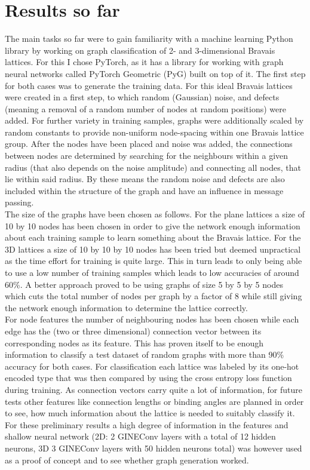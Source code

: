 \documentclass[11pt,a4paper]{article}
\begin{document}
\section{Results so far}
\label{sec:Results so far}
The main tasks so far were to gain familiarity with a machine learning Python library by working on graph classification of 2- and 3-dimensional Bravais lattices. 
For this I chose PyTorch, as it has a library for working with graph neural networks called PyTorch Geometric (PyG) built on top of it. 
The first step for both cases was to generate the training data. 
For this ideal Bravais lattices were created in a first step, to which random (Gaussian) noise, and defects (meaning a removal of a random number of nodes at random positions) were added. 
For further variety in training samples, graphs were additionally scaled by random constants to provide non-uniform node-spacing within one Bravais lattice group. 
After the nodes have been placed and noise was added, the connections between nodes are determined by searching for the neighbours within a given radius (that also depends on the noise amplitude) and connecting all nodes, that lie within said radius. 
By these means the random noise and defects are also included within the structure of the graph and have an influence in message passing. \\
The size of the graphs have been chosen as follows. 
For the plane lattices a size of 10 by 10 nodes has been chosen in order to give the network enough information about each training sample to learn something about the Bravais lattice. 
For the 3D lattices a  size of 10 by 10 by 10 nodes has been tried but deemed unpractical as the time effort for training is quite large. 
This in turn leads to only being able to use a low number of training samples which leads to low accuracies of around 60\%. 
A better approach proved to be using graphs of size 5 by 5 by 5 nodes which cuts the total number of nodes per graph by a factor of 8 while still giving the network enough information to determine the lattice correctly. \\
For node features the number of neighbouring nodes has been chosen while each edge has the (two or three dimensional) connection vector between its corresponding nodes as its feature. 
This has proven itself to be enough information to classify a test dataset of random graphs with more than 90\% accuracy for both cases. 
For classification each lattice was labeled by its one-hot encoded type that was then compared by using the  cross entropy loss function during training. 
As connection vectors carry quite a lot of information, for future tests other features like connection lengths or binding angles are planned in order to see, how much information about the lattice is needed to suitably classify it. 
For these preliminary results a high degree of information in the features and shallow neural network (2D: 2 GINEConv layers \cite{pygteamGINEConv2024} with a total of 12 hidden neurons, 3D 3 GINEConv layers with 50 hidden neurons total) was however used as a proof of concept and to see whether graph generation worked. 
\end{document}
